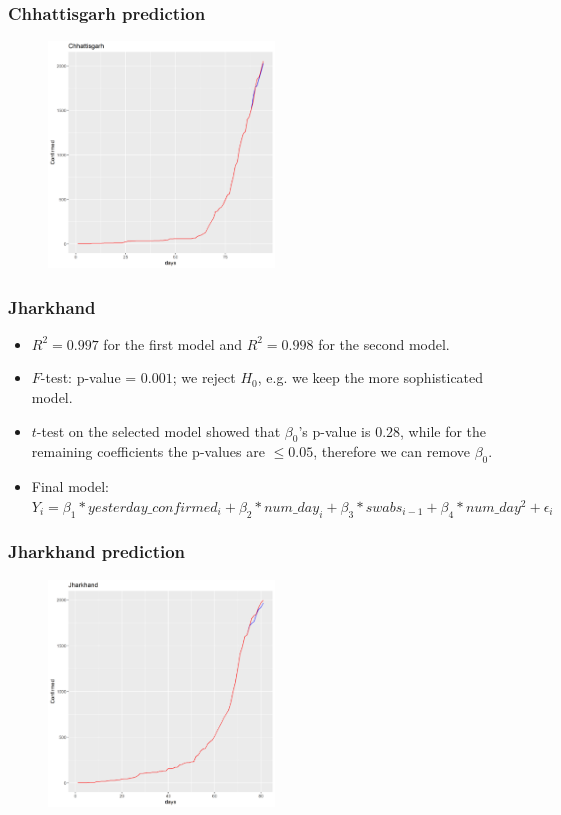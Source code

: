 \documentclass{beamer}
\begin{document}
\begin{frame}
\frametitle{Chhattisgarh prediction}
\begin{figure}
	\includegraphics[width=\linewidth, height=6cm]{../plots/pred/normal/Chhattisgarh_predictions_final.png}
\end{figure}
\end{frame}

\begin{frame}
\frametitle{Jharkhand}
\begin{itemize}
	\item $R^2 = 0.997$ for the first model and $R^2 = 0.998$ for the second model. 
	\item $F$-test: p-value = $0.001$; we reject $H_0$, e.g. we keep the more sophisticated model.
	\item $t$-test on the selected model showed that $\beta_0$'s p-value is $0.28$, while for the remaining coefficients the p-values are $\leq 0.05$, therefore we can remove $\beta_0$.
	\item Final model: $Y_i = \beta_1*yesterday\_confirmed_i + \beta_2*num\_day_i + \beta_3*swabs_{i-1} + \beta_4*num\_day^2 + \epsilon_i $
	
\end{itemize}
\end{frame}

\begin{frame}
\frametitle{Jharkhand prediction}
\begin{figure}
	\includegraphics[width=\linewidth, height=6cm]{../plots/pred/normal/Jharkhand_predictions_final.png}
\end{figure}
\end{frame}
\end{document}
